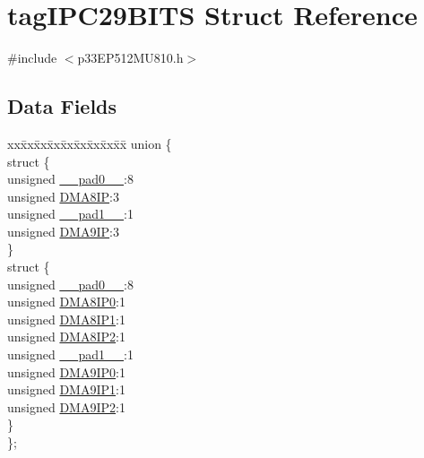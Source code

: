 \hypertarget{structtag_i_p_c29_b_i_t_s}{}\section{tag\+I\+P\+C29\+B\+I\+TS Struct Reference}
\label{structtag_i_p_c29_b_i_t_s}


{\ttfamily \#include $<$p33\+E\+P512\+M\+U810.\+h$>$}

\subsection*{Data Fields}
\begin{DoxyCompactItemize}
\item 
\begin{tabbing}
xx\=xx\=xx\=xx\=xx\=xx\=xx\=xx\=xx\=\kill
union \{\\
\>struct \{\\
\>\>unsigned \hyperlink{structtag_i_p_c29_b_i_t_s_adf71f3d8410c1f1dbbc96680a92c49af}{\_\_pad0\_\_}:8\\
\>\>unsigned \hyperlink{structtag_i_p_c29_b_i_t_s_af7d5991d413de38cfabb03c863cbb152}{DMA8IP}:3\\
\>\>unsigned \hyperlink{structtag_i_p_c29_b_i_t_s_acaf2d0924a107ec6e8d2e31febaf66f9}{\_\_pad1\_\_}:1\\
\>\>unsigned \hyperlink{structtag_i_p_c29_b_i_t_s_a37931c8d6dd606882060d654a981c793}{DMA9IP}:3\\
\>\} \\
\>struct \{\\
\>\>unsigned \hyperlink{structtag_i_p_c29_b_i_t_s_adf71f3d8410c1f1dbbc96680a92c49af}{\_\_pad0\_\_}:8\\
\>\>unsigned \hyperlink{structtag_i_p_c29_b_i_t_s_ac897b5221f41142708ded668052d22e6}{DMA8IP0}:1\\
\>\>unsigned \hyperlink{structtag_i_p_c29_b_i_t_s_ad58d421860197a280ad320f81f99cea9}{DMA8IP1}:1\\
\>\>unsigned \hyperlink{structtag_i_p_c29_b_i_t_s_ac40f15cc94d2fce6afa946ebfb16ec95}{DMA8IP2}:1\\
\>\>unsigned \hyperlink{structtag_i_p_c29_b_i_t_s_acaf2d0924a107ec6e8d2e31febaf66f9}{\_\_pad1\_\_}:1\\
\>\>unsigned \hyperlink{structtag_i_p_c29_b_i_t_s_af76e2c67c4716860a2d7ab6cce25b1b0}{DMA9IP0}:1\\
\>\>unsigned \hyperlink{structtag_i_p_c29_b_i_t_s_ac6ace7b53ca60a61c244def317b11620}{DMA9IP1}:1\\
\>\>unsigned \hyperlink{structtag_i_p_c29_b_i_t_s_a794566a7fafe27404abf5caecd46c9f7}{DMA9IP2}:1\\
\>\} \\
\}; \\

\end{tabbing}\end{DoxyCompactItemize}


